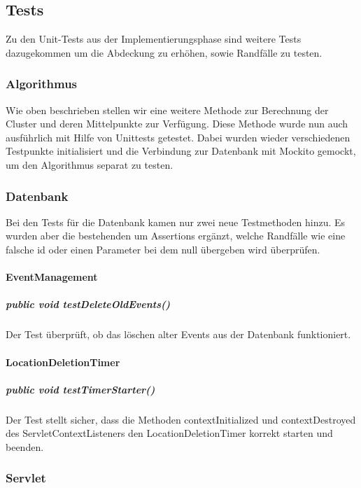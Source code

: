 \documentclass{scrartcl}
\begin{document}
\subsection{Tests}
Zu den Unit-Tests aus der Implementierungsphase sind weitere Tests dazugekommen um die Abdeckung zu erhöhen, sowie Randfälle zu testen.
\subsubsection{Algorithmus}
Wie oben beschrieben stellen wir eine weitere Methode zur Berechnung der Cluster und deren Mittelpunkte zur Verfügung. Diese Methode wurde nun auch ausführlich mit Hilfe von Unittests getestet. Dabei wurden wieder verschiedenen Testpunkte initialisiert und die Verbindung zur Datenbank mit Mockito gemockt, um den Algorithmus separat zu testen.
\subsubsection{Datenbank}
Bei den Tests für die Datenbank kamen nur zwei neue Testmethoden hinzu.
Es wurden aber die bestehenden um Assertions ergänzt, welche Randfälle wie eine falsche id oder einen Parameter bei dem null übergeben wird überprüfen.
\paragraph{EventManagement}
\subparagraph{public void testDeleteOldEvents()}
Der Test überprüft, ob das löschen alter Events aus der Datenbank funktioniert.
\paragraph{LocationDeletionTimer}
\subparagraph{public void testTimerStarter()}
Der Test stellt sicher, dass die Methoden contextInitialized und contextDestroyed des ServletContextListeners den LocationDeletionTimer korrekt starten und beenden.


\subsubsection{Servlet}
\end{document}
